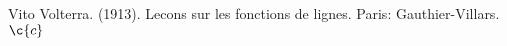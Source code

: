 \documentclass[uplatex, dvipdfmx]{jsarticle}
\begin{document}
Vito Volterra. (1913). Lecons sur les fonctions de lignes. Paris: Gauthier-Villars.
$\c{c}$
\end{document}
